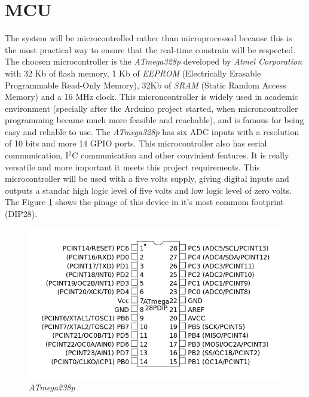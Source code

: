\section{MCU}\label{sec:mcu-hw}
		The system will be microcontrolled rather than microprocessed because this is the most practical way to ensure that the real-time constrain will be respected. The choosen microcontroller is the \textit{ATmega328p} developed by \textit{Atmel Corporation} with 32 Kb of flash memory, 1 Kb of \textit{EEPROM} (Electrically Erasable Programmable Read-Only Memory), 32Kb of \textit{SRAM} (Static Random Access Memory) and a 16 MHz clock. This microncontroller is widely used in academic environment (specially after the Arduino project started, when microncontroller programming became much more feasible and reachable), and is famous for being easy and reliable to use. The \textit{ATmega328p} has six ADC inputs with a resolution of 10 bits and more 14 GPIO ports. This microcontroller also has serial communication, I$^2$C communication and other convinient features. It is really versatile and more important it meets this project requirements. This microcontroller will be used with a five volts supply, giving digital inputs and outputs a standar high logic level of five volts and low logic level of zero volts. The Figure \ref{fig:atmega328p} shows the pinage of this device in it's most commom footprint (DIP28).

		\begin{figure}[htbp]
			\centering
			\includegraphics[scale=0.7]{figuras/fig-atmega328p.png}
			\caption{\textit{ATmega238p} \cite{coorporation2011atmel}}
			\label{fig:atmega328p}
		\end{figure}
	
